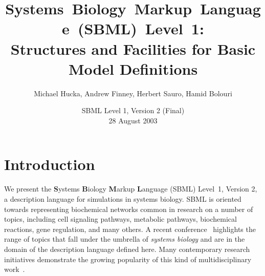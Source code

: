 \documentclass[10pt]{cekarticle}
\newcommand{\changed}[1]{\textcolor{BrickRed}{#1}}
\begin{document}

\title{\mbox{Systems Biology Markup Language (SBML) Level 1:}\\
  Structures and Facilities for Basic Model Definitions}

\author{Michael Hucka, Andrew Finney, Herbert Sauro, Hamid Bolouri}


\address{Systems Biology Workbench Development Group\\
  JST ERATO Kitano Symbiotic Systems Project\\
  Control and Dynamical Systems, MC 107-81\\
  California Institute of Technology, Pasadena, CA 91125, USA\\[3pt]
  \url{http://www.cds.caltech.edu/erato}}



\date{\vspace*{-1ex}SBML Level 1, \changed{Version 2 (Final)}\\[3pt]
  \changed{28 August 2003}\vspace*{-10pt}}

\renewcommand{\baselinestretch}{0.96}
\maketitlepage
\renewcommand{\baselinestretch}{0.98}


\section{Introduction}
\label{sec:introduction}

We present the \textbf{S}ystems \textbf{B}iology \textbf{M}arkup
\textbf{L}anguage (SBML) Level~1\changed{, Version 2}, a description
language for simulations in systems biology.  SBML is oriented towards
representing biochemical networks common in research on a number of topics,
including cell signaling pathways, metabolic pathways, biochemical
reactions, gene regulation, and many others.  A recent
conference~\citep{kitano:2001} highlights the range of topics that fall
under the umbrella of \emph{systems biology} and are in the domain of the
description language defined here.  Many contemporary research initiatives
demonstrate the growing popularity of this kind of multidisciplinary
work~\cite[e.g.,][]{abbott:1999,gilman:2000,popel:1998,smaglik:2000,smaglik:2000b}.
\end{document}
